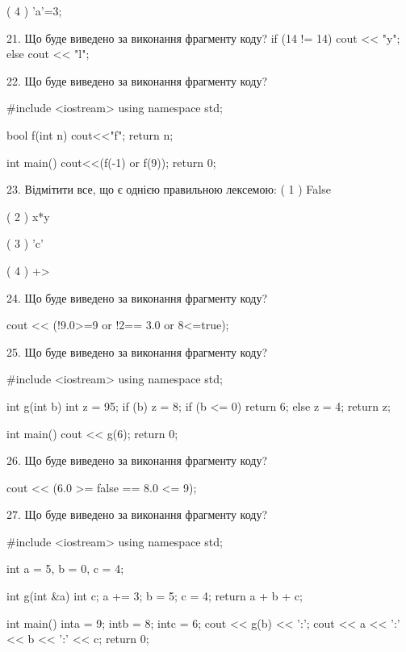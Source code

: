 \documentclass[11pt, ukrainian]{article}
\begin{document}
\begin{large}
( 4 ) 'a'=3;


21. Що буде виведено за виконання фрагменту коду?
if (14 != 14)
    cout << "y";
else
    cout << "l";



22. Що буде виведено за виконання фрагменту коду?

#include <iostream>
using namespace std;

bool f(int n){
    cout<<"f";
    return n;
}

int main(){
    cout<<(f(-1) or f(9));
    return 0;
}


23. Відмітити все, що є однією правильною лексемою:
( 1 ) False

( 2 ) x*y

( 3 ) 'c'

( 4 ) +>


24. Що буде виведено за виконання фрагменту коду?

cout << (!9.0>=9 or !2== 3.0 or 8<=true);


25. Що буде виведено за виконання фрагменту коду?

#include <iostream>
using namespace std;

int g(int b){
    int z = 95;
    if (b) 
        z = 8;
    if (b <= 0)
         return 6;
    else
         z = 4;
    return z;
}

int main(){
    cout << g(6);
    return 0;
}



26. Що буде виведено за виконання фрагменту коду?

cout << (6.0 >= false == 8.0 <= 9);


27. Що буде виведено за виконання фрагменту коду?

#include <iostream>
using namespace std;

int a = 5, b = 0, c = 4;

int g(int &a){
int c;    a += 3;
    b = 5;
    c = 4;
    return a + b + c;
}

int main(){
    inta = 9;
    intb = 8;
    intc = 6;
    cout << g(b) << ':';
    cout << a << ':' << b << ':' << c;
    return 0; 
}


\end{large}
\end{document}
